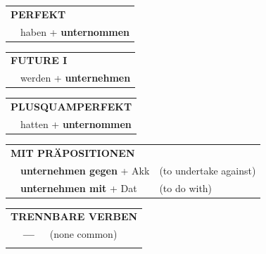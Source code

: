 \documentclass[10pt,a4paper]{revtex4-2}
\begin{document}
\begin{verbbox}
 \begin{tabular}{rl}
     \multicolumn{2}{l}{\textbf{PERFEKT}}\\
   & haben + \textbf{unternommen}\\
  \end{tabular}
\hfill
   \begin{tabular}{rl}
    \multicolumn{2}{l}{\textbf{FUTURE I} }\\
   & werden + \textbf{unternehmen}\\
  \end{tabular}
\hfill
   \begin{tabular}{rl}
      \multicolumn{2}{l}{\textbf{PLUSQUAMPERFEKT}}\\
   & hatten + \textbf{unternommen}\\
  \end{tabular}

   \vspace{10pt}

   \begin{tabular}{lll}
      \multicolumn{3}{l}{\textbf{MIT PRÄPOSITIONEN}}\\
& \textbf{unternehmen gegen} + Akk & (to undertake against)\\
& \textbf{unternehmen mit} + Dat & (to do with)\\
\end{tabular}
  \hfill
   \begin{tabular}{lll}
      \multicolumn{3}{l}{\textbf{TRENNBARE VERBEN}}\\
 & \textbf{---} & (none common)\\
\vspace{10pt}
  \end{tabular}

  \vspace{-5pt}

\end{verbbox}
\end{document}
